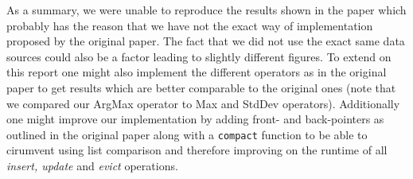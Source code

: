 As a summary, we were unable to reproduce the results shown in the paper which probably
has the reason that we have not the exact way of implementation proposed by the original
paper. The fact that we did not use the exact same data sources could also be a factor
leading to slightly different figures. To extend on this report one might also implement
the different operators as in the original paper to get results which are better comparable
to the original ones (note that we compared our ArgMax operator to Max and StdDev operators).
Additionally one might improve our implementation by adding front- and back-pointers as
outlined in the original paper along with a \texttt{compact} function to be able to
cirumvent using list comparison and therefore improving on the runtime of all
\textit{insert, update} and \textit{evict} operations.
